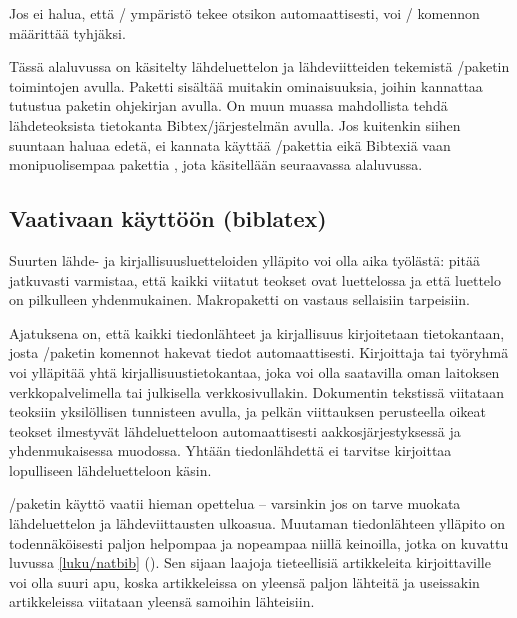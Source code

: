 Jos ei halua, että \-/ ympäristö tekee
otsikon automaattisesti, voi \-/ komennon määrittää
tyhjäksi.

\begin{koodilohkosis}
\renewcommand{\bibsection}{}
\end{koodilohkosis}

Tässä alaluvussa on käsitelty lähdeluettelon ja lähdeviitteiden
tekemistä \-/paketin toimintojen avulla. Paketti
sisältää muitakin ominaisuuksia, joihin kannattaa tutustua paketin
ohjekirjan avulla. On muun muassa mahdollista tehdä lähdeteoksista
tietokanta Bibtex\-/järjestelmän avulla. Jos kuitenkin siihen suuntaan
haluaa edetä, ei kannata käyttää \-/pakettia eikä
Bibtexiä vaan monipuolisempaa pakettia , jota
käsitellään seuraavassa alaluvussa.

\subsection{Vaativaan käyttöön (biblatex)}
\label{luku/biblatex}

Suurten lähde- ja kirjallisuusluetteloiden ylläpito voi olla aika
työlästä: pitää jatkuvasti varmistaa, että kaikki viitatut teokset ovat
luettelossa ja että luettelo on pilkulleen yhdenmukainen. Makropaketti
 on vastaus sellaisiin tarpeisiin.

Ajatuksena on, että kaikki tiedonlähteet ja kirjallisuus kirjoitetaan
tietokantaan, josta \-/paketin komennot hakevat tiedot
automaattisesti. Kirjoittaja tai työryhmä voi ylläpitää yhtä
kirjallisuustietokantaa, joka voi olla saatavilla oman laitoksen
verkkopalvelimella tai julkisella verkkosivullakin. Dokumentin tekstissä
viitataan teoksiin yksilöllisen tunnisteen avulla, ja pelkän viittauksen
perusteella oikeat teokset ilmestyvät lähdeluetteloon automaattisesti
aakkosjärjestyksessä ja yhdenmukaisessa muodossa. Yhtään tiedonlähdettä
ei tarvitse kirjoittaa lopulliseen lähdeluetteloon käsin.

\-/paketin käyttö vaatii hieman opettelua -- varsinkin
jos on tarve muokata lähdeluettelon ja lähdeviittausten ulkoasua.
Muutaman tiedonlähteen ylläpito on todennäköisesti paljon helpompaa ja
nopeampaa niillä keinoilla, jotka on kuvattu luvussa \ref{luku/natbib}
(). Sen sijaan laajoja tieteellisiä artikkeleita
kirjoittaville  voi olla suuri apu, koska
artikkeleissa on yleensä paljon lähteitä ja useissakin artikkeleissa
viitataan yleensä samoihin lähteisiin.

